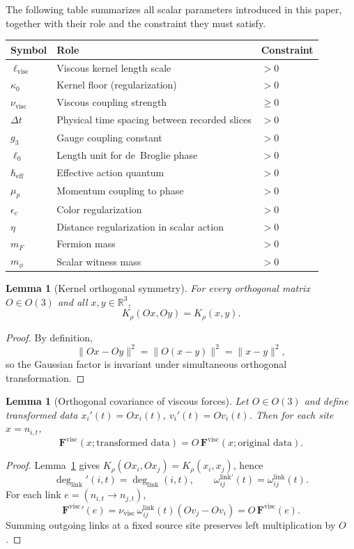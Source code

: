 \documentclass[11pt]{article}
\newtheorem{lemma}[theorem]{Lemma}
\theoremstyle{remark}
\newcommand{\R}{\mathbb R}
\begin{document}
The following table summarizes all scalar parameters introduced in this paper,
together with their role and the constraint they must satisfy.

\begin{center}
\begin{tabular}{@{}lll@{}}
\toprule
Symbol & Role & Constraint \\
\midrule
$\ell_{\mathrm{visc}}$ & Viscous kernel length scale & $>0$ \\
$\kappa_0$ & Kernel floor (regularization) & $>0$ \\
$\nu_{\mathrm{visc}}$ & Viscous coupling strength & $\ge0$ \\
$\Delta t$ & Physical time spacing between recorded slices & $>0$ \\
$g_3$ & Gauge coupling constant & $>0$ \\
$\ell_0$ & Length unit for de~Broglie phase & $>0$ \\
$\hbar_{\mathrm{eff}}$ & Effective action quantum & $>0$ \\
$\mu_p$ & Momentum coupling to phase & $>0$ \\
$\epsilon_c$ & Color regularization & $>0$ \\
$\eta$ & Distance regularization in scalar action & $>0$ \\
$m_F$ & Fermion mass & $>0$ \\
$m_\phi$ & Scalar witness mass & $>0$ \\
\bottomrule
\end{tabular}
\end{center}

\begin{lemma}[Kernel orthogonal symmetry]
\label{lem:kernel-orth}
For every orthogonal matrix $O\in O(3)$ and all $x,y\in\R^3$,
\[
K_\rho(Ox,Oy)=K_\rho(x,y).
\]
\end{lemma}
\begin{proof}
By definition,
\[
\|Ox-Oy\|^2=\|O(x-y)\|^2=\|x-y\|^2,
\]
so the Gaussian factor is invariant under simultaneous orthogonal transformation.
\end{proof}

\begin{lemma}[Orthogonal covariance of viscous forces]
\label{lem:orthogonal}
Let $O\in O(3)$ and define transformed data $x_i'(t)=Ox_i(t)$, $v_i'(t)=Ov_i(t)$.
Then for each site $x=n_{i,t}$,
\[
\mathbf F^{\mathrm{visc}}(x;\text{transformed data})=O\,\mathbf F^{\mathrm{visc}}(x;\text{original data}).
\]
\end{lemma}
\begin{proof}
Lemma~\ref{lem:kernel-orth} gives $K_\rho(Ox_i,Ox_j)=K_\rho(x_i,x_j)$, hence
\[
\deg_{\mathrm{link}}'(i,t)=\deg_{\mathrm{link}}(i,t),
\qquad
\omega_{ij}^{\mathrm{link}\prime}(t)=\omega_{ij}^{\mathrm{link}}(t).
\]
For each link $e=(n_{i,t}\to n_{j,t})$,
\[
\mathbf F^{\mathrm{visc}}{}'(e)
=\nu_{\mathrm{visc}}\,\omega^{\mathrm{link}}_{ij}(t)(Ov_j-Ov_i)
=O\,\mathbf F^{\mathrm{visc}}(e).
\]
Summing outgoing links at a fixed source site preserves left multiplication by $O$.
\end{proof}
\end{document}
